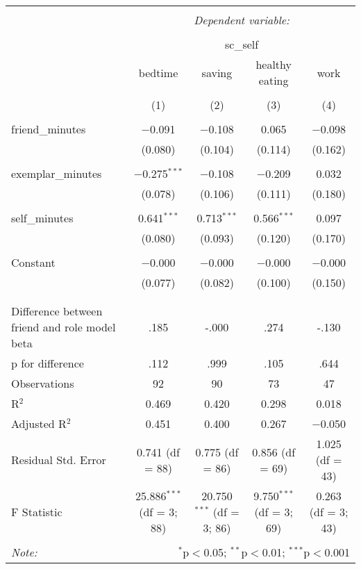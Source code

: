 
\begin{table}[!htbp] \centering 
  \caption{} 
  \label{} 
\begin{tabular}{@{\extracolsep{5pt}}lcccc} 
\\[-1.8ex]\hline 
\hline \\[-1.8ex] 
 & \multicolumn{4}{c}{\textit{Dependent variable:}} \\ 
\cline{2-5} 
\\[-1.8ex] & \multicolumn{4}{c}{sc\_self} \\ 
 & bedtime & saving & healthy eating & work \\ 
\\[-1.8ex] & (1) & (2) & (3) & (4)\\ 
\hline \\[-1.8ex] 
 friend\_minutes & $-$0.091 & $-$0.108 & 0.065 & $-$0.098 \\ 
  & (0.080) & (0.104) & (0.114) & (0.162) \\ 
  & & & & \\ 
 exemplar\_minutes & $-$0.275$^{***}$ & $-$0.108 & $-$0.209 & 0.032 \\ 
  & (0.078) & (0.106) & (0.111) & (0.180) \\ 
  & & & & \\ 
 self\_minutes & 0.641$^{***}$ & 0.713$^{***}$ & 0.566$^{***}$ & 0.097 \\ 
  & (0.080) & (0.093) & (0.120) & (0.170) \\ 
  & & & & \\ 
 Constant & $-$0.000 & $-$0.000 & $-$0.000 & $-$0.000 \\ 
  & (0.077) & (0.082) & (0.100) & (0.150) \\ 
  & & & & \\ 
\hline \\[-1.8ex] 
Difference between friend and role model beta & .185 & -.000 & .274 & -.130 \\ 
p for difference & .112 & .999 & .105 & .644 \\ 
Observations & 92 & 90 & 73 & 47 \\ 
R$^{2}$ & 0.469 & 0.420 & 0.298 & 0.018 \\ 
Adjusted R$^{2}$ & 0.451 & 0.400 & 0.267 & $-$0.050 \\ 
Residual Std. Error & 0.741 (df = 88) & 0.775 (df = 86) & 0.856 (df = 69) & 1.025 (df = 43) \\ 
F Statistic & 25.886$^{***}$ (df = 3; 88) & 20.750$^{***}$ (df = 3; 86) & 9.750$^{***}$ (df = 3; 69) & 0.263 (df = 3; 43) \\ 
\hline 
\hline \\[-1.8ex] 
\textit{Note:}  & \multicolumn{4}{r}{$^{*}$p$<$0.05; $^{**}$p$<$0.01; $^{***}$p$<$0.001} \\ 
\end{tabular} 
\end{table} 
